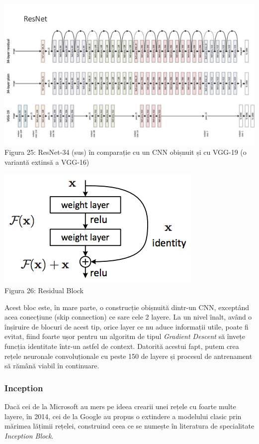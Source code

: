 \begin{center}
\includegraphics[scale=0.5]{resnet} \\
Figura 25: ResNet-34 (sus) în comparație cu un CNN obișnuit și cu VGG-19 (o variantă extinsă a VGG-16)
\end{center}

\begin{center}
\includegraphics[scale=0.7]{residualBlock} \\
Figura 26: Residual Block
\end{center}

Acest bloc este, în mare parte, o construcție obișnuită dintr-un CNN, exceptând acea conecțiune (skip connection) ce sare cele 2 layere. La un nivel înalt, având o înșiruire de blocuri de acest tip, orice layer ce nu aduce informații utile, poate fi evitat, fiind foarte ușor pentru un algoritm de tipul \textit{Gradient Descent} să învețe funcția identitate într-un astfel de context. Datorită acestui fapt, putem crea rețele neuronale convoluționale cu peste 150 de layere și procesul de antrenament să rămână viabil în continuare.

\subsubsection{Inception}
Dacă cei de la Microsoft au mers pe ideea crearii unei rețele cu foarte multe layere, în 2014, cei de la Google au propus o extindere a modelului clasic prin mărimea lățimii rețelei, construind ceea ce se numește în literatura de specialitate \textit{Inception Block}.

